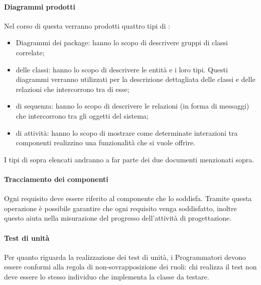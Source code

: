                         \paragraph*{Diagrammi prodotti}
                        Nel corso di questa  verranno prodotti quattro tipi di  :
                        \begin{itemize}
			\item Diagrammi dei package: hanno lo scopo di descrivere gruppi di classi correlate;
                        \item {} delle classi: hanno lo scopo di descrivere le entità e i loro tipi. Questi diagrammi
                                                verranno utilizzati per la descrizione dettagliata delle classi e delle relazioni che intercorrono tra di
                                                esse;
               
                        \item {} di sequenza:  hanno lo scopo di descrivere le relazioni (in forma di messaggi) che intercorrono tra gli oggetti del sistema;
                        \item {} di attivit\`a: hanno lo scopo di mostrare come determinate interazioni tra componenti
                                                realizzino una funzionalità che si vuole offrire.
                        \end{itemize}
                        I tipi di  sopra elencati andranno a far parte dei due documenti menzionati sopra.
		
			\paragraph*{Tracciamento dei componenti}
			Ogni requisito deve essere riferito al componente che lo soddisfa. Tramite questa operazione è possibile garantire che ogni requisito venga
			soddisfatto, inoltre questo aiuta nella misurazione del progresso dell'attività di progettazione.		
			
			\paragraph*{Test di unità}
			Per quanto riguarda la realizzazione dei test di unità, i Programmatori devono essere conformi 
			alla regola di non-sovrapposizione dei ruoli: chi realizza il test non deve essere lo stesso individuo 
			che implementa la classe da testare.
		
